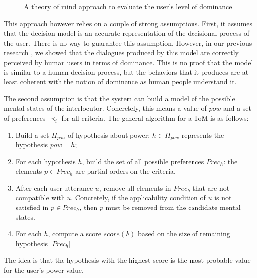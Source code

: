 \documentclass[sigconf]{aamas}  %
\begin{document}
	\begin{figure}
		\caption{A theory of mind approach to evaluate the user's level of dominance} 
		\label{fig:tom}
	\end{figure} 
	
	This approach however relies on a couple of strong assumptions. First, it assumes that the decision model is an accurate representation of the decisional process of the user. There is no way to guarantee this assumption. However, in our previous research \cite{ouali2017computational}, we showed that the dialogues produced by this model are correctly perceived by human users in terms of dominance. This is no proof that the model is similar to a human decision process, but the behaviors that it produces are at least coherent with the notion of dominance as human people understand it.
	
	The second assumption is that the system can build a model of the possible mental states of the interlocutor. Concretely, this means a value of $pow$ and a set of preferences $\prec_i$ for all criteria. The general algorithm for a ToM is as follows:
	\begin{enumerate}
		\item Build a set $H_{pow}$ of hypothesis about power: $h\in H_{pow}$ represents the hypothesis $pow=h$;
		\item For each hypothesis $h$, build the set of all possible preferences $Prec_h$: the elements $p\in Prec_h$ are partial orders on the criteria.
		\item After each user utterance $u$, remove all elements in $Prec_h$ that are not compatible with $u$. Concretely, if the applicability condition of $u$ is not satisfied in $p\in Prec_h$, then $p$ must be removed from the candidate mental states.
		\item For each $h$, compute a score $score(h)$ based on the size of remaining hypothesis $|Prec_h|$
	\end{enumerate}
	The idea is that the hypothesis with the highest score is the most probable value for the user's power value.
	
\end{document}
